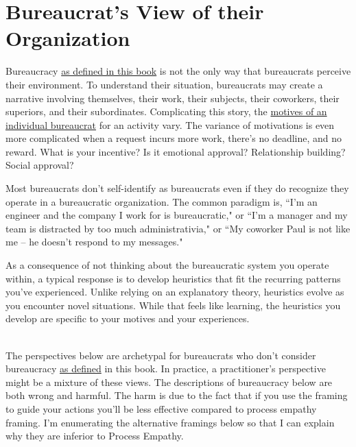 \section{Bureaucrat's View of their Organization\label{sec:alternative-views-from-within}}

Bureaucracy 
\hyperref[sec:define-bureaucracy]{as defined in this book} 
is not the only way that bureaucrats perceive their environment. To understand their situation, bureaucrats may create a narrative involving themselves, their work, their subjects, their coworkers, their superiors, and their subordinates. Complicating this story, the \hyperref[sec:motivations]{motives of an individual bureaucrat}
for an activity vary.
The variance of motivations is even more complicated when a request incurs more work, there's no deadline, and no reward. What is your incentive? Is it emotional approval? Relationship building? Social approval?

Most bureaucrats don't self-identify as bureaucrats even if they do recognize they operate in a bureaucratic organization. The common paradigm is, ``I'm an engineer and the company I work for is bureaucratic," or ``I'm a manager and my team is distracted by too much administrativia," or ``My coworker Paul is not like me --  he doesn't respond to my messages."

As a consequence of not thinking about the bureaucratic system you operate within, a typical response is to develop heuristics that fit the recurring patterns you've experienced. Unlike relying on an explanatory theory, heuristics evolve as you encounter novel situations. While that feels like learning, the heuristics you develop are specific to your motives and your experiences.

\ \\

The perspectives below are archetypal for bureaucrats who don't consider bureaucracy \hyperref[sec:define-bureaucracy]{as defined} in this book.
In practice, a practitioner's perspective might be a mixture of these views. The descriptions of bureaucracy below are both wrong and harmful. The harm is due to the fact that if you use the framing to guide your actions you'll be less effective compared to process empathy framing.  I'm enumerating the alternative framings below so that I can explain why they are inferior to Process Empathy. 

